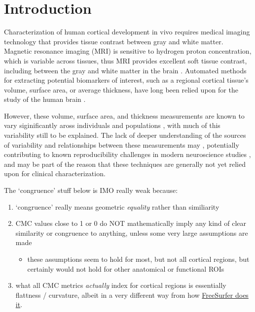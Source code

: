 \documentclass{article}
\begin{document}
\section{Introduction} \label{intro}

Characterization of human cortical development in vivo requires medical
imaging technology that provides tissue contrast between gray and white
matter. Magnetic resonance imaging (MRI) is sensitive to hydrogen proton
concentration, which is variable across tissues, thus MRI provides excellent
soft tissue contrast, including between the gray and white matter in the
brain \citep{duboisMRINeonatalBrain2021}. Automated methods for extracting
potential biomarkers of interest, such as a regional cortical tissue's
volume, surface area, or average thickness, have long been relied upon for
the study of the human brain
\citep{fischlFreeSurfer2012,levmanPediatricStructuralMRI2017,levmanStructuralMagneticResonance2019a,mccannStructuralMagneticResonance2021}.

However, these volume, surface area, and thickness
measurements are known to vary siginificantly aross individuals and populations
\citep{fischlFreeSurfer2012,levmanPediatricStructuralMRI2017,levmanStructuralMagneticResonance2019a}, with much of this
variability still to be explained. The lack of deeper understanding of the sources of variability
and relationships between these measurements may ,
potentially contributing to known reproducibility challenges in modern
neuroscience studies
\citep{martinezReproducibilityBraincognitionRelationships2015,marekReproducibleBrainwideAssociation2022},
and may be part of the reason that these techniques are generally not yet
relied upon for clinical characterization.


\color{orange}
The `congruence' stuff below is IMO really weak because:

	\begin{enumerate}
		\item `congruence' really means geometric \emph{equality} rather than
		similiarity

		\item CMC values close to 1 or 0 do NOT mathematically imply any kind of
		clear similarity or congruence to anything, unless some very large
		assumptions are made

		\begin{itemize}
			\item these assumptions seem to hold for most, but not all cortical
			regions, but certainly would not hold for other anatomical or
			functional ROIs
		\end{itemize}

		\item what all CMC metrics \emph{actually} index for cortical regions is
		essentially flattness / curvature, albeit in a very different way from
		how \href{https://surfer.nmr.mgh.harvard.edu/fswiki/MeanCurvature}{FreeSurfer
		does it}.
	\end{enumerate}
\end{document}
